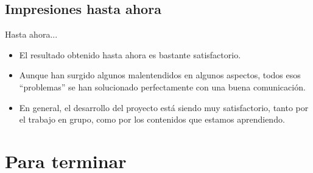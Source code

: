 \documentclass[9pt,xcolor=svgnames]{beamer}
\begin{document}
  \subsection{Impresiones hasta ahora}

  \begin{frame}{Hasta ahora...}
    \begin{itemize}
    \item El resultado obtenido hasta ahora es bastante satisfactorio.
    \item Aunque han surgido algunos malentendidos en algunos aspectos, 
      todos esos ``problemas'' se han solucionado perfectamente con una
      buena comunicación.
    \item En general, el desarrollo del proyecto está siendo muy 
      satisfactorio, tanto por el trabajo en grupo, como por los contenidos
      que estamos aprendiendo.
    \end{itemize}
  \end{frame}
  
 \section{Para terminar}
  

  
\end{document}
